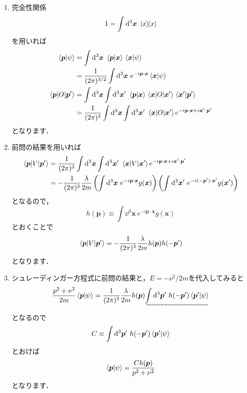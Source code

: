 \documentclass[a4paper,pdflatex,ja=standard]{bxjsarticle}
\begin{document}
\begin{enumerate}

  \item 

  完全性関係
  \begin{equation}
    1
    =
    \int\dd^3 \bm{x}\ 
    \ketbra*{x}{x}
  \end{equation}
  を用いれば
  \begin{align}
    \ev*{\bm{p}|\psi}
    &=
    \int\dd^3\bm{x}\ 
    \ev*{\bm{p}|\bm{x}}\ev*{\bm{x}|\psi}
    \nonumber
    \\
    &=
    \frac{1}{(2\pi)^{3/2}}\int\dd^3\bm{x}\ 
    e^{-i\bm{p}\cdot\bm{x}}\ev*{\bm{x}|\psi}
    \\
    \ev*{\bm{p}|O|\bm{p}'}
    &=
    \int\dd^3\bm{x}\int\dd^3\bm{x}'\ 
    \ev*{\bm{p}|\bm{x}}\ev*{\bm{x}|O|\bm{x}'}\ev*{\bm{x}'|\bm{p}'}
    \nonumber
    \\
    &=
    \frac{1}{(2\pi)^3}
    \int\dd^3\bm{x}\int\dd^3\bm{x}'\ 
    \ev*{\bm{x}|O|\bm{x}'}e^{-i\bm{p}\cdot\bm{x}+i\bm{x}'\cdot\bm{p}'}
  \end{align}
  となります．


  \item 

  前問の結果を用いれば
  \begin{align}
    \ev*{\bm{p}|V|\bm{p}'}
    &=
    \frac{1}{(2\pi)^3}
    \int\dd^3\bm{x}\int\dd^3\bm{x}'\ 
    \ev*{\bm{x}|V|\bm{x}'}e^{-i\bm{p}\cdot\bm{x}+i\bm{x}'\cdot\bm{p}'}   
    \nonumber
    \\
    &=
    -\frac{1}{(2\pi)^3}\frac{\lambda}{2m}
    \left(  
      \int\dd^3\bm{x}\ e^{-i\bm{p}\cdot\bm{x}}g(\bm{x})
    \right)
    \left(  
      \int\dd^3\bm{x}'\ e^{-i(-\bm{p}')\cdot\bm{x}'}g(\bm{x}')
    \right)
  \end{align}
  となるので，
  \begin{equation}
    h(\bm{p})
    \equiv
    \int\dd^3\bm{x}\ e^{-i\bm{p}\cdot\bm{x}}g(\bm{x})    
    \label{hp}
  \end{equation}
  とおくことで
  \begin{equation}
    \ev*{\bm{p}|V|\bm{p}'}
    =
    -\frac{1}{(2\pi)^3}\frac{\lambda}{2m}h(\bm{p})h(-\bm{p}')        
  \end{equation}
  となります．


  \item 

  シュレーディンガー方程式に前問の結果と，$E=-\nu^2/2m$を代入してみると
  \begin{equation}
    \frac{p^2+\nu^2}{2m}\ev*{\bm{p}|\psi}
    =
    \frac{1}{(2\pi)^3}\frac{\lambda}{2m}
    h(\bm{p})
    \uwave{
      \int\dd^3\bm{p}'\ 
      h(-\bm{p}')\ev*{\bm{p}'|\psi}
    }
  \end{equation}
  となるので
  \begin{equation}
    C
    \equiv
    \int\dd^3\bm{p}'\ 
    h(-\bm{p}')\ev*{\bm{p}'|\psi}
  \end{equation}
  とおけば
  \begin{equation}
    \ev{\bm{p}|\psi}
    =
    \frac{Ch(\bm{p})}{p^2+\nu^2}
  \end{equation}
  となります．



\end{enumerate}
\end{document}
